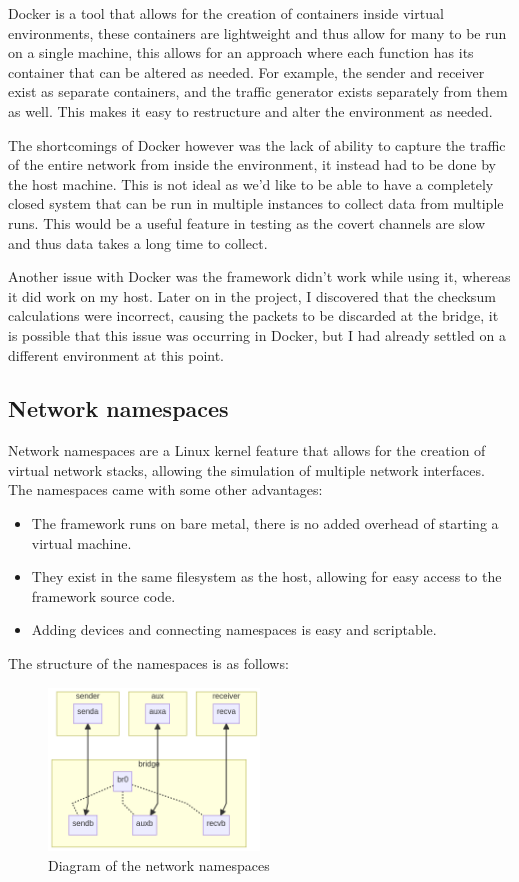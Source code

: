 Docker \cite{docker} is a tool that allows for the creation of containers inside virtual environments, these containers are lightweight and thus allow for many to be run on a single machine, this allows for an approach where each function has its container that can be altered as needed. For example, the sender and receiver exist as separate containers, and the traffic generator exists separately from them as well. This makes it easy to restructure and alter the environment as needed.

The shortcomings of Docker however was the lack of ability to capture the traffic of the entire network from inside the environment, it instead had to be done by the host machine. This is not ideal as we'd like to be able to have a completely closed system that can be run in multiple instances to collect data from multiple runs. This would be a useful feature in testing as the covert channels are slow and thus data takes a long time to collect.

Another issue with Docker was the framework didn't work while using it, whereas it did work on my host. Later on in the project, I discovered that the checksum calculations were incorrect, causing the packets to be discarded at the bridge, it is possible that this issue was occurring in Docker, but I had already settled on a different environment at this point.

\subsection{Network namespaces}

Network namespaces are a Linux kernel feature that allows for the creation of virtual network stacks, allowing the simulation of multiple network interfaces. The namespaces came with some other advantages:

\begin{itemize}
    \item The framework runs on bare metal, there is no added overhead of starting a virtual machine.
    \item They exist in the same filesystem as the host, allowing for easy access to the framework source code.
    \item Adding devices and connecting namespaces is easy and scriptable.
\end{itemize}

The structure of the namespaces is as follows:

\begin{figure}[H]
    \centering
    \includegraphics[width=0.5\textwidth]{fig/namespace_setup.png}
    \caption{Diagram of the network namespaces}
    \label{fig:namespace_diagram}
\end{figure}

